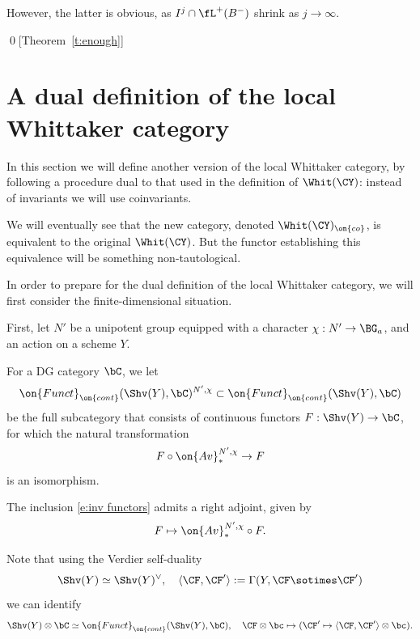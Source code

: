 \documentclass[9pt]{amsart}
\theoremstyle{definition}
\theoremstyle{remark}
\newcommand{\thmref}[1]{Theorem~\ref{#1}}
\numberwithin{equation}{section}
\begin{document}
\medskip

However, the latter is obvious, as $I^j\cap \fL^+(B^-)$ shrink as $j\to \infty$.

\qed[\thmref{t:enough}]

\section{A dual definition of the local Whittaker category}  \label{s:dual}

In this section we will define another version of the local Whittaker category, by following a 
procedure dual to that used in the definition of $\Whit(\CY)$: instead of invariants we will
use coinvariants. 

\medskip

We will eventually see that the new category, denoted $\Whit(\CY)_{\on{co}}$, is equivalent to
the original $\Whit(\CY)$. But the functor establishing this equivalence will be something non-tautological. 

  \label{ss:coinv}

In order to prepare for the dual definition of the local Whittaker category, we will first consider the
finite-dimensional situation. 

\sssec{}

First, let $N'$ be a unipotent group equipped with a character $\chi:N'\to \BG_a$, and an action on a scheme $Y$. 

\medskip

For a DG category $\bC$, we let
\begin{equation} \label{e:inv functors}
\on{Funct}_{\on{cont}}(\Shv(Y),\bC)^{N',\chi}\subset \on{Funct}_{\on{cont}}(\Shv(Y),\bC)
\end{equation}
be the full subcategory that consists of continuous functors $F:\Shv(Y)\to \bC$, for which the natural transformation
$$F\circ \on{Av}^{N',\chi}_*\to F$$
is an isomorphism.

\medskip

The inclusion \eqref{e:inv functors} admits a right adjoint, given by
$$F\mapsto \on{Av}^{N',\chi}_*\circ F.$$

\sssec{}  \label{sss:tensor prod and inv}

Note that using the Verdier self-duality 
$$\Shv(Y)\simeq \Shv(Y)^\vee, \quad \langle \CF,\CF'\rangle:=\Gamma(Y,\CF\sotimes \CF')$$
we can identify 
$$\Shv(Y)\otimes \bC\simeq \on{Funct}_{\on{cont}}(\Shv(Y),\bC), \quad \CF\otimes \bc\mapsto 
(\CF'\mapsto \langle \CF,\CF'\rangle \otimes \bc).$$
\end{document}
